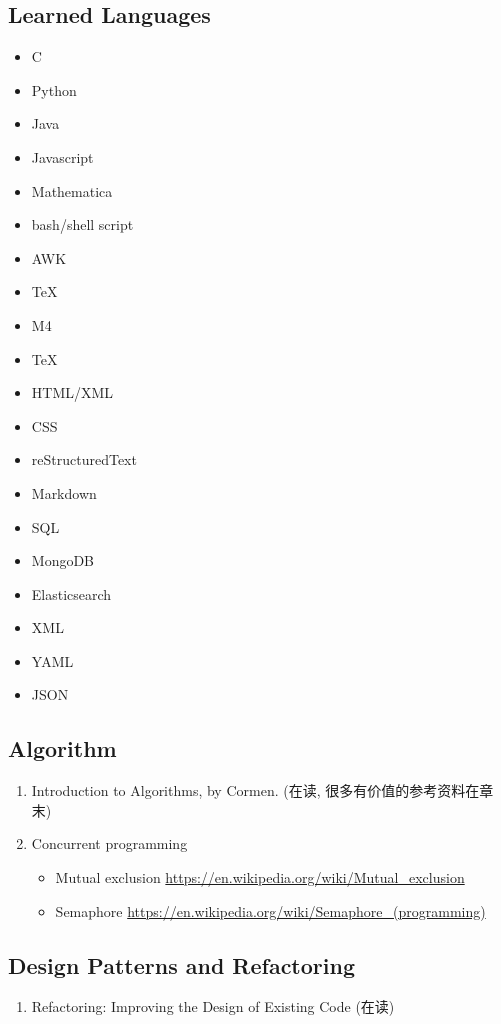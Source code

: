 \documentclass{article}
\begin{document}
\subsection{Learned Languages}
\begin{itemize}
    \item C
    \item Python
    \item Java
    \item Javascript
    \item Mathematica
    \item bash/shell script
    \item AWK
    \item TeX
    \item M4
    \item TeX
    \item HTML/XML
    \item CSS
    \item reStructuredText
    \item Markdown
    \item SQL
    \item MongoDB
    \item Elasticsearch
    \item XML
    \item YAML
    \item JSON
\end{itemize}
%
\subsection{Algorithm}
\begin{enumerate}
    \item Introduction to Algorithms, by Cormen. (在读, 很多有价值的参考资料在章末)
    \item Concurrent programming
        \begin{itemize}
            \item Mutual exclusion \url{https://en.wikipedia.org/wiki/Mutual_exclusion}
            \item Semaphore \url{https://en.wikipedia.org/wiki/Semaphore_(programming)}
        \end{itemize}
\end{enumerate}
\subsection{Design Patterns and Refactoring}
\begin{enumerate}
    \item Refactoring: Improving the Design of Existing Code (在读)
\end{enumerate}
\end{document}
